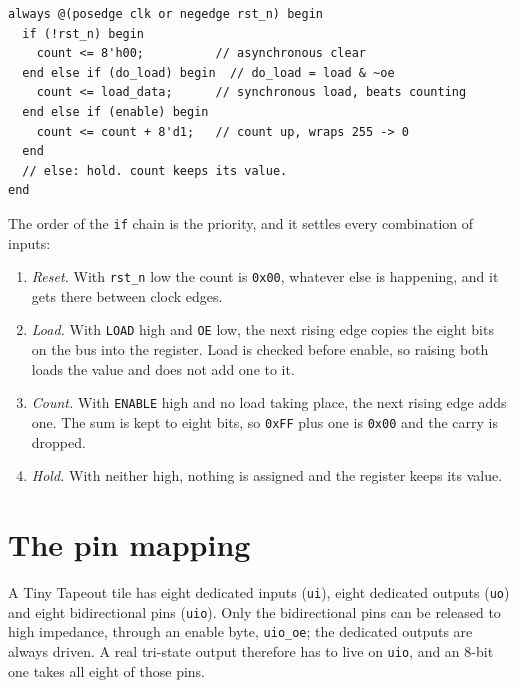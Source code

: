 \documentclass[11pt]{article}
\begin{document}
\begin{Verbatim}[bgcolor=codefill]
always @(posedge clk or negedge rst_n) begin
  if (!rst_n) begin
    count <= 8'h00;          // asynchronous clear
  end else if (do_load) begin  // do_load = load & ~oe
    count <= load_data;      // synchronous load, beats counting
  end else if (enable) begin
    count <= count + 8'd1;   // count up, wraps 255 -> 0
  end
  // else: hold. count keeps its value.
end
\end{Verbatim}

The order of the \texttt{if} chain is the priority, and it settles every combination of inputs:

\begin{enumerate}
\item \textit{Reset.} With \texttt{rst\_n} low the count is \texttt{0x00}, whatever else is
  happening, and it gets there between clock edges.
\item \textit{Load.} With \texttt{LOAD} high and \texttt{OE} low, the next rising edge copies the
  eight bits on the bus into the register. Load is checked before enable, so raising both loads the value and
  does not add one to it.
\item \textit{Count.} With \texttt{ENABLE} high and no load taking place, the next rising edge adds
  one. The sum is kept to eight bits, so \texttt{0xFF} plus one is \texttt{0x00} and the carry
  is dropped.
\item \textit{Hold.} With neither high, nothing is assigned and the register keeps its value.
\end{enumerate}

\newpage

\section{The pin mapping}\label{sec:pins}

A Tiny Tapeout tile has eight dedicated inputs (\texttt{ui}), eight dedicated outputs
(\texttt{uo}) and eight bidirectional pins (\texttt{uio}). Only the bidirectional pins can be
released to high impedance, through an enable byte, \texttt{uio\_oe}; the dedicated outputs are
always driven. A real tri-state output therefore has to live on \texttt{uio}, and an 8-bit one
takes all eight of those pins.
\end{document}
